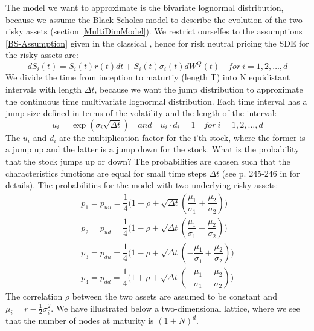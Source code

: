 The model we want to approximate is the bivariate lognormal distribution, because we assume the Black Scholes model to describe the evolution of the two risky assets (section \ref{MultiDimModel}). We restrict ourselfes to the assumptions \ref{BS-Assumption} given in the classical \parencite{B-S-Paper}, hence for risk neutral pricing the SDE for the risky assets are:
$$dS_i(t)=S_i(t)r(t)dt+S_i(t)\sigma_i(t)dW^Q(t) \quad for \ i=1,2,\ldots,d$$
We divide the time from inception to maturtiy (length T) into N equidistant intervals with length $\Delta t$, because we want the jump distribution to approximate the continuous time multivariate lognormal distribution. Each time interval has a jump size defined in terms of the volatility and the length of the interval:
$$u_i=\exp(\sigma_i \sqrt{\Delta t}) \quad and \quad u_i \cdot d_i = 1 \quad for \ i=1,2,\ldots,d $$
The $u_i$ and $d_i$ are the multiplication factor for the i'th stock, where the former is a jump up and the latter is a jump down for the stock. What is the probability that the stock jumps up or down? The probabilities are chosen such that the characteristics functions are equal for small time steps $\Delta t$ (see p. 245-246 in \parencite{BEG} for details). The probabilities for the model with two underlying risky assets:
\begin{equation}
\begin{split}
p_1=p_{uu}=\dfrac{1}{4}\bigg( 1+\rho + \sqrt{\Delta t}(\dfrac{\mu_1}{\sigma_1} + \dfrac{\mu_2}{\sigma_2}) \bigg)\\
p_2=p_{ud}=\dfrac{1}{4}\bigg( 1-\rho + \sqrt{\Delta t}(\dfrac{\mu_1}{\sigma_1} - \dfrac{\mu_2}{\sigma_2}) \bigg)\\
p_3=p_{du}=\dfrac{1}{4}\bigg( 1-\rho + \sqrt{\Delta t}(-\dfrac{\mu_1}{\sigma_1} + \dfrac{\mu_2}{\sigma_2}) \bigg)\\
p_4=p_{dd}=\dfrac{1}{4}\bigg( 1+\rho + \sqrt{\Delta t}(-\dfrac{\mu_1}{\sigma_1} - \dfrac{\mu_2}{\sigma_2}) \bigg)
\end{split}
\end{equation} 
The correlation $\rho$ between the two assets are assumed to be constant and $\mu_i=r-\frac{1}{2}\sigma_i^2$. We have illustrated below a two-dimensional lattice, where we see that the number of nodes at maturity is $(1+N)^d$. 

